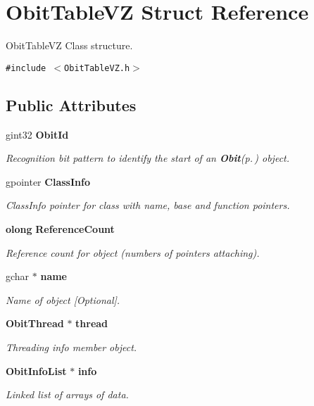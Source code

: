 \section{Obit\-Table\-VZ Struct Reference}
\label{structObitTableVZ}
Obit\-Table\-VZ Class structure.  


{\tt \#include $<$Obit\-Table\-VZ.h$>$}

\subsection*{Public Attributes}
\begin{CompactItemize}
\item 
gint32 {\bf Obit\-Id}
\begin{CompactList}\small\item\em Recognition bit pattern to identify the start of an {\bf Obit}{\rm (p.\,\pageref{structObit})} object. \item\end{CompactList}\item 
gpointer {\bf Class\-Info}
\begin{CompactList}\small\item\em Class\-Info pointer for class with name, base and function pointers. \item\end{CompactList}\item 
{\bf olong} {\bf Reference\-Count}
\begin{CompactList}\small\item\em Reference count for object (numbers of pointers attaching). \item\end{CompactList}\item 
gchar $\ast$ {\bf name}
\begin{CompactList}\small\item\em Name of object [Optional]. \item\end{CompactList}\item 
{\bf Obit\-Thread} $\ast$ {\bf thread}
\begin{CompactList}\small\item\em Threading info member object. \item\end{CompactList}\item 
{\bf Obit\-Info\-List} $\ast$ {\bf info}
\begin{CompactList}\small\item\em Linked list of arrays of data. \item\end{CompactList}\item 

\end{CompactItemize}
